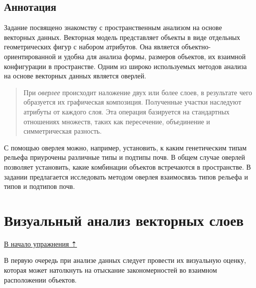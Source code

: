 \documentclass[12pt,]{book}
\begin{document}
\hypertarget{overlay-annotation}{%
\subsection{Аннотация}\label{overlay-annotation}}

Задание посвящено знакомству с пространственным анализом на основе векторных данных. Векторная модель представляет объекты в виде отдельных геометрических фигур с набором атрибутов. Она является объектно-ориентированной и удобна для анализа формы, размеров объектов, их взаимной конфигурации в пространстве. Одним из широко используемых методов анализа на основе векторных данных является оверлей.

\begin{quote}
При \emph{оверлее} происходит наложение двух или более слоев, в результате чего образуется их графическая композиция. Полученные участки наследуют атрибуты от каждого слоя. Эта операция базируется на стандартных отношениях множеств, таких как пересечение, объединение и симметрическая разность.
\end{quote}

С помощью оверлея можно, например, установить, к каким генетическим типам рельефа приурочены различные типы и подтипы почв. В общем случае оверлей позволяет установить, какие комбинации объектов встречаются в пространстве. В задании предлагается исследовать методом оверлея взаимосвязь типов рельефа и типов и подтипов почв.

\hypertarget{overlay-vectors}{%
\section{Визуальный анализ векторных слоев}\label{overlay-vectors}}

\protect\hyperlink{overlay}{В начало упражнения ⇡}

В первую очередь при анализе данных следует провести их визуальную оценку, которая может натолкнуть на отыскание закономерностей во взаимном расположении объектов.
\end{document}
